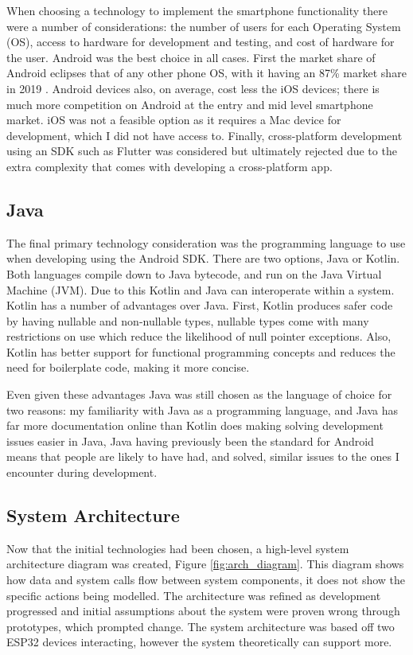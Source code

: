 \documentclass{l4proj}
\begin{document}
When choosing a technology to implement the smartphone functionality there were a number of considerations: the number of users for each Operating System (OS), access to hardware for development and testing, and cost of hardware for the user. Android was the best choice in all cases. First the market share of Android eclipses that of any other phone OS, with it having an 87\% market share in 2019 \citep{cohen_ios_2020}. Android devices also, on average, cost less the iOS devices; there is much more competition on Android at the entry and mid level smartphone market. iOS was not a feasible option as it requires a Mac device for development, which I did not have access to. Finally, cross-platform development using an SDK such as Flutter was considered but ultimately rejected due to the extra complexity that comes with developing a cross-platform app.

\subsection{Java}

The final primary technology consideration was the programming language to use when developing using the Android SDK. There are two options, Java or Kotlin. Both languages compile down to Java bytecode, and run on the Java Virtual Machine (JVM). Due to this Kotlin and Java can interoperate within a system. Kotlin has a number of advantages over Java. First, Kotlin produces safer code by having nullable and non-nullable types, nullable types come with many restrictions on use which reduce the likelihood of null pointer exceptions. Also, Kotlin has better support for functional programming concepts and reduces the need for boilerplate code, making it more concise.

Even given these advantages Java was still chosen as the language of choice for two reasons: my familiarity with Java as a programming language, and Java has far more documentation online than Kotlin does making solving development issues easier in Java, Java having previously been the standard for Android means that people are likely to have had, and solved, similar issues to the ones I encounter during development.

\subsection{System Architecture}

Now that the initial technologies had been chosen, a high-level system architecture diagram was created, Figure \ref{fig:arch_diagram}. This diagram shows how data and system calls flow between system components, it does not show the specific actions being modelled. The architecture was refined as development progressed and initial assumptions about the system were proven wrong through prototypes, which prompted change. The system architecture was based off two ESP32 devices interacting, however the system theoretically can support more.
\end{document}
